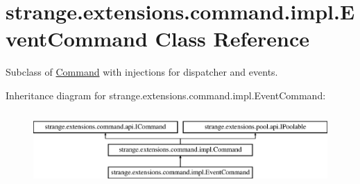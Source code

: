 \hypertarget{classstrange_1_1extensions_1_1command_1_1impl_1_1_event_command}{\section{strange.\-extensions.\-command.\-impl.\-Event\-Command Class Reference}
\label{classstrange_1_1extensions_1_1command_1_1impl_1_1_event_command}
}


Subclass of \hyperlink{classstrange_1_1extensions_1_1command_1_1impl_1_1_command}{Command} with injections for dispatcher and events.  


Inheritance diagram for strange.\-extensions.\-command.\-impl.\-Event\-Command\-:\begin{figure}[H]
\begin{center}
\leavevmode
\includegraphics[height=2.809365cm]{classstrange_1_1extensions_1_1command_1_1impl_1_1_event_command}
\end{center}
\end{figure}
